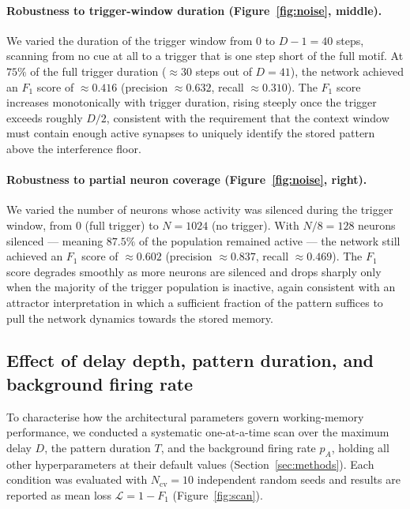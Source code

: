 \documentclass{scrartcl}
\begin{document}
\paragraph{Robustness to trigger-window duration (Figure~\ref{fig:noise}, middle).}
We varied the duration of the trigger window from $0$ to $D-1 = 40$ steps, scanning from no cue at all to a trigger that is one step short of the full motif. At $75\%$ of the full trigger duration ($\approx 30$ steps out of $D = 41$), the network achieved an $F_1$ score of $\approx 0.416$ (precision $\approx 0.632$, recall $\approx 0.310$). The $F_1$ score increases monotonically with trigger duration, rising steeply once the trigger exceeds roughly $D/2$, consistent with the requirement that the context window must contain enough active synapses to uniquely identify the stored pattern above the interference floor.

\paragraph{Robustness to partial neuron coverage (Figure~\ref{fig:noise}, right).}
We varied the number of neurons whose activity was silenced during the trigger window, from $0$ (full trigger) to $N = 1024$ (no trigger). With $N/8 = 128$ neurons silenced --- meaning $87.5\%$ of the population remained active --- the network still achieved an $F_1$ score of $\approx 0.602$ (precision $\approx 0.837$, recall $\approx 0.469$). The $F_1$ score degrades smoothly as more neurons are silenced and drops sharply only when the majority of the trigger population is inactive, again consistent with an attractor interpretation in which a sufficient fraction of the pattern suffices to pull the network dynamics towards the stored memory.
%

%
\subsection{Effect of delay depth, pattern duration, and background firing rate}

To characterise how the architectural parameters govern working-memory performance, we conducted a systematic one-at-a-time scan over the maximum delay $D$, the pattern duration $T$, and the background firing rate $p_A$, holding all other hyperparameters at their default values (Section~\ref{sec:methods}). Each condition was evaluated with $N_\mathrm{cv} = 10$ independent random seeds and results are reported as mean loss $\mathcal{L} = 1 - F_1$ (Figure~\ref{fig:scan}).
\end{document}
